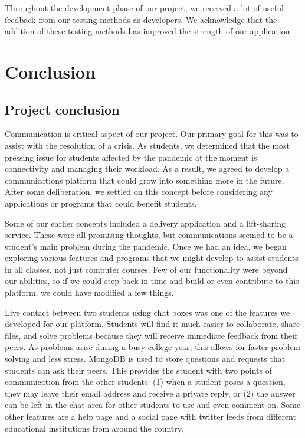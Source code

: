 \hfill 

Throughout the development phase of our project, we received a lot of useful feedback from our testing methods as developers. We acknowledge that the addition of these testing methods has improved the strength of our application.



\chapter{Conclusion}
\section{Project conclusion}
Communication is critical aspect of our project. Our primary goal for this was to assist with the resolution of a crisis. As students, we determined that the most pressing issue for students affected by the pandemic at the moment is connectivity and managing their workload. As a result, we agreed to develop a communications platform that could grow into something more in the future. After some deliberation, we settled on this concept before considering any applications or programs that could benefit students.\hfill \break

Some of our earlier concepts included a delivery application and a lift-sharing service. These were all promising thoughts, but communications seemed to be a student’s main problem during the pandemic. Once we had an idea, we began exploring various features and programs that we might develop to assist students in all classes, not just computer courses. Few of our functionality were beyond our abilities, so if we could step back in time and build or even contribute to this platform, we could have modified a few things. \hfill \break

Live contact between two students using chat boxes was one of the features we developed for our platform. Students will find it much easier to collaborate, share files, and solve problems because they will receive immediate feedback from their peers. As problems arise during a busy college year, this allows for faster problem solving and less stress. MongoDB\cite{ref17} is used to store questions and requests that students can ask their peers. This provides the student with two points of communication from the other students: (1) when a student poses a question, they may leave their email address and receive a private reply, or (2) the answer can be left in the chat area for other students to use and even comment on. Some other features are a help page and a social page with twitter feeds from different educational institutions from around the country.\hfill \break

